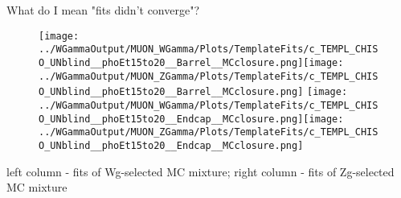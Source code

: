 \documentclass{beamer}
\begin{document}
\begin{frame}{What do I mean "fits didn't converge"?}
  \begin{figure}
    \centering
    \texttt{[image: ../WGammaOutput/MUON\_WGamma/Plots/TemplateFits/c\_TEMPL\_CHISO\_UNblind\_\_phoEt15to20\_\_Barrel\_\_MCclosure.png]}\texttt{[image: ../WGammaOutput/MUON\_ZGamma/Plots/TemplateFits/c\_TEMPL\_CHISO\_UNblind\_\_phoEt15to20\_\_Barrel\_\_MCclosure.png]}
    \texttt{[image: ../WGammaOutput/MUON\_WGamma/Plots/TemplateFits/c\_TEMPL\_CHISO\_UNblind\_\_phoEt15to20\_\_Endcap\_\_MCclosure.png]}\texttt{[image: ../WGammaOutput/MUON\_ZGamma/Plots/TemplateFits/c\_TEMPL\_CHISO\_UNblind\_\_phoEt15to20\_\_Endcap\_\_MCclosure.png]}
  \end{figure}
  \scriptsize left column - fits of Wg-selected MC mixture; right column - fits of Zg-selected MC mixture
\end{frame}

\end{document}
